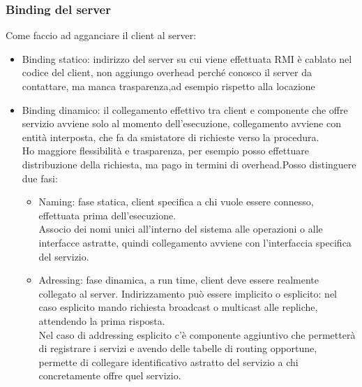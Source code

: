 \documentclass[16px]{article}
\begin{document}
\subsubsection{Binding del server}
Come faccio ad agganciare il client al server:
\begin{itemize}
\item Binding statico: indirizzo del server su cui viene effettuata RMI è cablato nel codice del client, non aggiungo overhead perché conosco il server da contattare, ma manca trasparenza,ad esempio rispetto alla locazione
\item Binding dinamico: il collegamento effettivo tra client e componente che offre servizio avviene solo al momento dell'esecuzione, collegamento avviene con entità interposta, che fa da smistatore di richieste verso la procedura.\\ Ho maggiore flessibilità e trasparenza, per esempio posso effettuare distribuzione della richiesta, ma pago in termini di overhead.Posso distinguere due fasi:
\begin{itemize}
\item Naming: fase statica, client specifica a chi vuole essere connesso, effettuata prima dell'esecuzione.\\ Associo dei nomi unici all'interno del sistema alle operazioni o alle interfacce astratte, quindi collegamento avviene con l'interfaccia specifica del servizio.
\item Adressing: fase dinamica, a run time, client deve essere realmente collegato al server. Indirizzamento può essere implicito o esplicito: nel caso esplicito mando richiesta broadcast o multicast alle repliche, attendendo la prima risposta.\\ Nel caso di addressing esplicito c'è componente aggiuntivo che permetterà di registrare i servizi e avendo delle tabelle di routing opportune, permette di collegare identificativo astratto del servizio a chi concretamente offre quel servizio.
\end{itemize}
\end{itemize}
\end{document}
